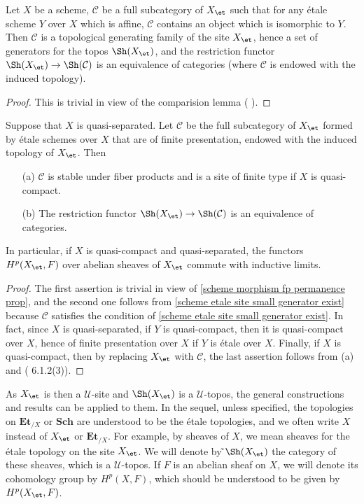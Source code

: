\begin{proposition}\label{scheme etale site small generator exist}
Let $X$ be a scheme, $\mathcal{C}$ be a full subcategory of $X_\et$ such that for any \'etale scheme $Y$ over $X$ which is affine, $\mathcal{C}$ contains an object which is isomorphic to $Y$. Then $\mathcal{C}$ is a topological generating family of the site $X_\et$, hence a set of  generators for the topos $\Sh(X_\et)$, and the restriction functor $\Sh(X_\et)\to\Sh(\mathcal{C})$ is an equivalence of categories (where $\mathcal{C}$ is endowed with the induced topology).
\end{proposition}
\begin{proof}
This is trivial in view of the comparision lemma (\cite{SGA4-1} ).
\end{proof}

\begin{corollary}\label{scheme qs etale site of fp scheme prop}
Suppose that $X$ is quasi-separated. Let $\mathcal{C}$ be the full subcategory of $X_\et$ formed by \'etale schemes over $X$ that are of finite presentation, endowed with the induced topology of $X_\et$. Then
\begin{enumerate}
    \item[(a)] $\mathcal{C}$ is stable under fiber products and is a site of finite type if $X$ is quasi-compact.
    \item[(b)] The restriction functor $\Sh(X_\et)\to\Sh(\mathcal{C})$ is an equivalence of categories.
\end{enumerate}
In particular, if $X$ is quasi-compact and quasi-separated, the functors $H^p(X_\et,F)$ over abelian sheaves of $X_\et$ commute with inductive limits.
\end{corollary}
\begin{proof}
The first assertion is trivial in view of \cref{scheme morphism fp permanence prop}, and the second one follows from \cref{scheme etale site small generator exist} because $\mathcal{C}$ satisfies the condition of \cref{scheme etale site small generator exist}. In fact, since $X$ is quasi-separated, if $Y$ is quasi-compact, then it is quasi-compact over $X$, hence of finite presentation over $X$ if $Y$ is \'etale over $X$. Finally, if $X$ is quasi-compact, then by replacing $X_\et$ with $\mathcal{C}$, the last assertion follows from (a) and (\cite{SGA4-2}  6.1.2(3)).
\end{proof}

As $X_\et$ is then a $\mathscr{U}$-site and $\Sh(X_\et)$ is a $\mathscr{U}$-topos, the general constructions and results can be applied to them. In the sequel, unless specified, the topologies on $\mathbf{Et}_{/X}$ or $\mathbf{Sch}$ are understood to be the \'etale topologies, and we often write $X$ instead of $X_\et$ or $\mathbf{Et}_{/X}$. For example, by sheaves of $X$, we mean sheaves for the \'etale topology on the site $X_{\et}$. We will denote by ̃$\Sh(X_\et)$ the category of these sheaves, which is a $\mathscr{U}$-topos. If $F$ is an abelian sheaf on $X$, we will denote its cohomology group by $H^p(X,F)$, which should be understood to be given by $H^p(X_\et,F)$.
